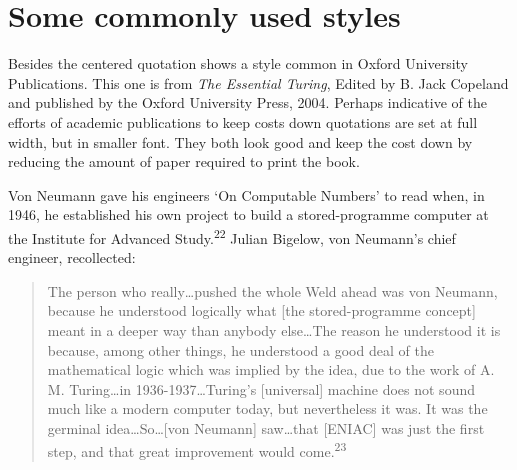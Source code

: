 \section{Some commonly used styles}

Besides the centered quotation  shows a style
common in Oxford University Publications. This one is from \textit{The Essential Turing}, Edited by B. Jack Copeland and  published by the Oxford University Press, 2004. Perhaps indicative of the efforts of academic publications to keep costs down quotations are set at full width, but in smaller font. They both look good and keep the cost down by reducing the amount of paper required to print the book.

\topline

Von Neumann gave his engineers `On Computable Numbers' to read when, in
1946, he established his own project to build a stored-programme computer at
the Institute for Advanced Study.\textsuperscript{22} Julian Bigelow, von Neumann's chief engineer,
recollected:
\vspace*{-20pt}






\begin{quotation}

The person who really\ldots pushed the whole Weld ahead was von Neumann, because he
understood logically what [the stored-programme concept] meant in a deeper way than
anybody else\ldots The reason he understood it is because, among other things, he understood
a good deal of the mathematical logic which was implied by the idea, due to the
work of A. M. Turing\ldots in 1936-1937\ldots Turing's [universal] machine does not sound
much like a modern computer today, but nevertheless it was. It was the germinal
idea\ldots So\ldots [von Neumann] saw\ldots that \textsc{[ENIAC]} was just the first step, and that great
improvement would come.\textsuperscript{23}
\end{quotation}

